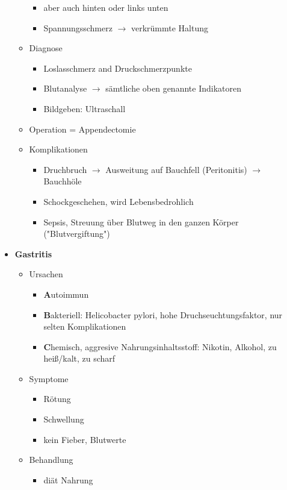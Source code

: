 \begin{itemize}
\begin{itemize}
\begin{itemize}
						 	\item aber auch hinten oder links unten
						 	\item Spannungsschmerz $\rightarrow$ verkrümmte Haltung
						 \end{itemize}
					\item Diagnose
						\begin{itemize}
							\item Loslasschmerz and Druckschmerzpunkte
							\item Blutanalyse $\rightarrow$ sämtliche oben genannte Indikatoren
							\item Bildgeben: Ultraschall
						\end{itemize}
					\item Operation = Appendectomie
					\item Komplikationen
					\begin{itemize}
						\item Druchbruch $\rightarrow$ Ausweitung auf Bauchfell (Peritonitis) $\rightarrow$ Bauchhöle 
						\item Schockgeschehen, wird Lebensbedrohlich
						\item Sepsis, Streuung über Blutweg in den ganzen Körper ("Blutvergiftung")
					\end{itemize}
				\end{itemize}
			\item \textbf{Gastritis}
				\begin{itemize}
					\item Ursachen
						\begin{itemize}
							\item \textbf{A}utoimmun
							\item \textbf{B}akteriell: Helicobacter pylori, hohe Druchseuchtungsfaktor, nur selten Komplikationen
							\item \textbf{C}hemisch, aggresive Nahrungsinhaltsstoff: Nikotin, Alkohol, zu heiß/kalt, zu scharf
						\end{itemize}
					\item Symptome
						\begin{itemize}
							\item Rötung
							\item Schwellung
							\item kein Fieber, Blutwerte
						\end{itemize}
					\item Behandlung
						\begin{itemize}
							\item diät Nahrung

\end{itemize}
\end{itemize}
\end{itemize}
